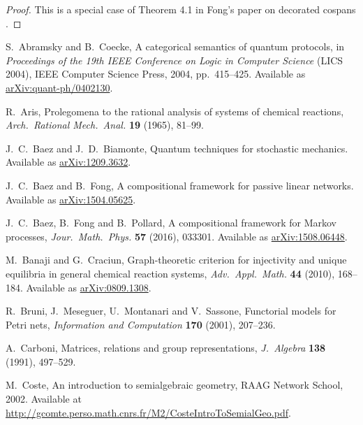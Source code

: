 \documentclass{compositionalityarticle}
\theoremstyle{plain}
\theoremstyle{remark}
\begin{document}
\begin{proof}
This is a special case of Theorem 4.1 in Fong's paper on decorated cospans \cite{Fong2015}.  
\end{proof}

\begin{thebibliography}{9}

     S.\ Abramsky and B.\ Coecke, A categorical semantics of quantum protocols, in \textsl{Proceedings of the 19th IEEE Conference on Logic in
 Computer Science} (LICS 2004), IEEE Computer Science Press, 2004, pp.\ 415--425.  Available as \href{http://arxiv.org/abs/quant-ph/0402130}{arXiv:quant-ph/0402130}.

 R.\ Aris, Prolegomena to the rational analysis of systems
of chemical reactions, \textsl{Arch.\ Rational Mech.\ Anal.} {\bf 19} (1965), 81--99.

 J.\ C.\ Baez and J.\ D.\ Biamonte, Quantum techniques for stochastic mechanics. Available as \href{http://arxiv.org/abs/1209.3632}{arXiv:1209.3632}.

 J.\ C.\ Baez and B.\ Fong,  A compositional framework for passive linear networks.   Available as \href{http://arxiv.org/abs/1504.05625}{arXiv:1504.05625}.

  J.\ C.\ Baez, B.\ Fong and B.\ Pollard, A compositional framework for Markov processes, \textsl{Jour.\ Math.\ Phys.} \textbf{57} (2016), 033301.  Available as \href{http://arxiv.org/abs/1508.06448}{arXiv:1508.06448}.

 M.\ Banaji and G.\ Craciun, Graph-theoretic criterion for injectivity and unique equilibria in general chemical reaction systems, \textsl{Adv.\ Appl.\ Math.} \textbf{44} (2010), 168--184. Available as \href{http://arxiv.org/abs/0809.1308}{arXiv:0809.1308}.

 R.\ Bruni, J.\ Meseguer, U.\ Montanari and V.\ Sassone, Functorial models for Petri nets, \textsl{Information and Computation} \textbf{170} (2001), 207--236.

 A.\ Carboni, Matrices, relations and group representations, 
\textsl{J.\ Algebra} \textbf{138} (1991), 497--529.

 M.\ Coste, An introduction to semialgebraic geometry, RAAG Network School, 2002.  Available at \hfill \break \href{http://gcomte.perso.math.cnrs.fr/M2/CosteIntroToSemialGeo.pdf}{http://gcomte.perso.math.cnrs.fr/M2/CosteIntroToSemialGeo.pdf}.


\end{thebibliography}
\end{document}
